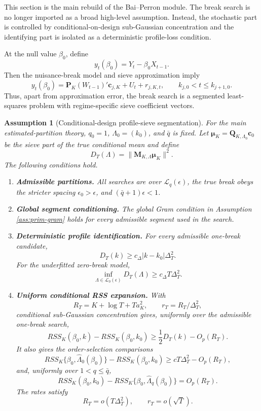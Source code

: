 \documentclass[12pt]{article}
\numberwithin{equation}{section}
\newtheorem{assumption}{Assumption}
\theoremstyle{definition}
\begin{document}
This section is the main rebuild of the Bai--Perron module.  The break search
is no longer imported as a broad high-level assumption.  Instead, the stochastic
part is controlled by conditional-on-design sub-Gaussian concentration and the
identifying part is isolated as a deterministic profile-loss condition.

At the null value \(\beta_0\), define
\[
    y_t(\beta_0)=Y_t-\beta_0X_{t-1}.
\]
Then the nuisance-break model and sieve approximation imply
\[
    y_t(\beta_0)
    =
    \bm P_K(W_{t-1})'\bm c_{j,K}+U_t+r_{j,K,t},
    \qquad
    k_{j,0}<t\leq k_{j+1,0}.
\]
Thus, apart from approximation error, the break search is a segmented least-
squares problem with regime-specific sieve coefficient vectors.

\begin{assumption}[Conditional-design profile-sieve segmentation]
\label{ass:bp-profile-sieve}
For the main estimated-partition theory, \(q_0=1\), \(\Lambda_0=(k_0)\), and
\(\bar q\) is fixed.  Let \(\bm\mu_K=\bm Q_{K,\Lambda_0}\bm c_0\) be the sieve
part of the true conditional mean and define
\[
    D_T(\Lambda)=\|\bm M_{K,\Lambda}\bm\mu_K\|^2.
\]
The following conditions hold.
\begin{enumerate}
    \item \textbf{Admissible partitions.}  All searches are over
    \(\mathcal L_q(\epsilon)\), the true break obeys the stricter spacing
    \(\epsilon_0>\epsilon\), and \((\bar q+1)\epsilon<1\).

    \item \textbf{Global segment conditioning.}  The global Gram condition in
    Assumption \ref{ass:prim-gram} holds for every admissible segment used in
    the search.

    \item \textbf{Deterministic profile identification.}  For every admissible
    one-break candidate,
    \[
        D_T(k)\geq c_\Delta |k-k_0|\Delta_T^2.
    \]
    For the underfitted zero-break model,
    \[
        \inf_{\Lambda\in\mathcal L_0(\epsilon)}D_T(\Lambda)
        \geq c_\Delta T\Delta_T^2.
    \]

    \item \textbf{Uniform conditional RSS expansion.}  With
    \[
        R_T=K+\log T+Ta_K^2,
        \qquad
        r_T=R_T/\Delta_T^2,
    \]
    conditional sub-Gaussian concentration gives, uniformly over the admissible
    one-break search,
    \[
        RSS_K(\beta_0,k)-RSS_K(\beta_0,k_0)
        \geq \frac12D_T(k)-O_p(R_T).
    \]
    It also gives the order-selection comparisons
    \[
        RSS_K\{\beta_0,\widehat\Lambda_0(\beta_0)\}
        -RSS_K(\beta_0,k_0)
        \geq cT\Delta_T^2-O_p(R_T),
    \]
    and, uniformly over \(1<q\leq\bar q\),
    \[
        RSS_K(\beta_0,k_0)
        -RSS_K\{\beta_0,\widehat\Lambda_q(\beta_0)\}=O_p(R_T).
    \]
    The rates satisfy
    \[
        R_T=o(T\Delta_T^2),
        \qquad
        r_T=o(\sqrt T).
    \]
\end{enumerate}
\end{assumption}
\end{document}
